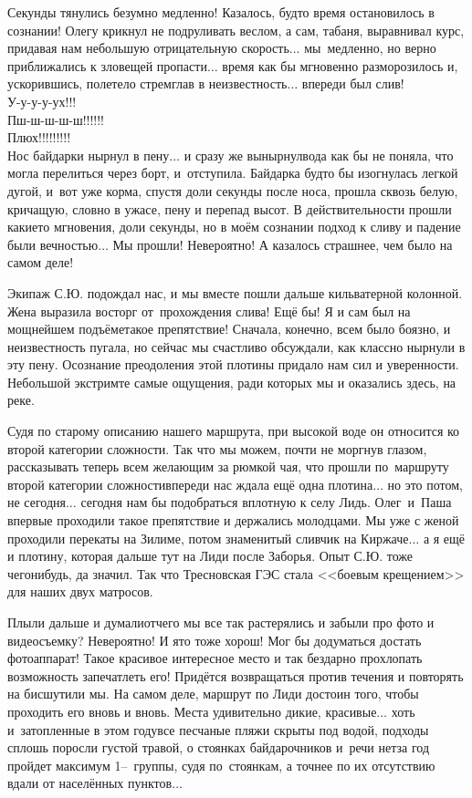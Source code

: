 Секунды тянулись безумно медленно! Казалось, будто время остановилось в сознании! Олегу крикнул не подруливать веслом, а сам, табаня, выравнивал курс, придавая нам небольшую отрицательную скорость$\ldots$ мы~медленно, но верно приближались к зловещей пропасти$\ldots$ время как бы мгновенно разморозилось и, ускорившись, полетело стремглав в неизвестность$\ldots$ впереди был слив!\\
{\large У-у-у-у-ух!!!\\
\hspace*{29mm} \Large Пш-ш-ш-ш-ш!!!!!!\\
\hspace*{80mm} \LARGE Плюх!!!!!!!!!}\\
\noindent Нос байдарки нырнул в пену$\ldots$ и сразу же вынырнул\mdash вода как бы не поняла, что могла перелиться через борт, и~отступила. Байдарка будто бы изогнулась легкой дугой, и~вот уже корма, спустя доли секунды после носа, прошла сквозь белую, кричащую, словно в ужасе, пену и перепад высот. В действительности прошли какие\sdash то мгновения, доли секунды, но в моём сознании подход к сливу и падение были вечностью$\ldots$ Мы прошли! Невероятно! А казалось страшнее, чем было на самом деле! 
 
Экипаж С.Ю. подождал нас, и мы вместе пошли дальше кильватерной колонной. Жена выразила восторг от~прохождения слива! Ещё бы! Я и сам был на мощнейшем подъёме\mdash такое препятствие! Сначала, конечно, всем было боязно, и неизвестность пугала, но сейчас мы счастливо обсуждали, как классно нырнули в эту пену. Осознание преодоления этой плотины придало нам сил и уверенности. Небольшой экстрим\mdash те самые ощущения, ради которых мы и оказались здесь, на реке. 

Судя по старому описанию нашего маршрута, при высокой воде он относится ко второй категории сложности. Так что мы можем, почти не моргнув глазом, рассказывать теперь всем желающим за рюмкой чая, что прошли по~маршруту второй категории сложности\mdash впереди нас ждала ещё одна плотина$\ldots$ но это потом, не сегодня$\ldots$ сегодня нам бы подобраться вплотную к селу Лидь. Олег~и~Паша впервые проходили такое препятствие и держались молодцами. Мы уже с женой проходили перекаты на Зилиме, потом знаменитый сливчик на Киржаче$\ldots$ а я ещё и плотину, которая дальше тут на Лиди после Заборья. Опыт С.Ю. тоже чего\sdash нибудь, да значил. Так что Тресновская ГЭС стала <<боевым крещением>> для наших двух матросов.

Плыли дальше и думали\mdash отчего мы все так растерялись и забыли про фото и видеосъемку? Невероятно! И я\sdash то тоже хорош! Мог бы додуматься достать фотоаппарат! Такое красивое интересное место и так бездарно прохлопать возможность запечатлеть его! Придётся возвращаться против течения и повторять на бис\mdash шутили мы. На самом деле, маршрут по Лиди достоин того, чтобы проходить его вновь и вновь. Места удивительно дикие, красивые$\ldots$ хоть и~затопленные в этом году\mdash все песчаные пляжи скрыты под водой, подходы сплошь поросли густой травой, о стоянках байдарочников и~речи нет\mdash за год пройдет максимум 1\thinspace\nobreakdash--~группы, судя по~стоянкам, а точнее по их отсутствию вдали от населённых пунктов$\ldots$

